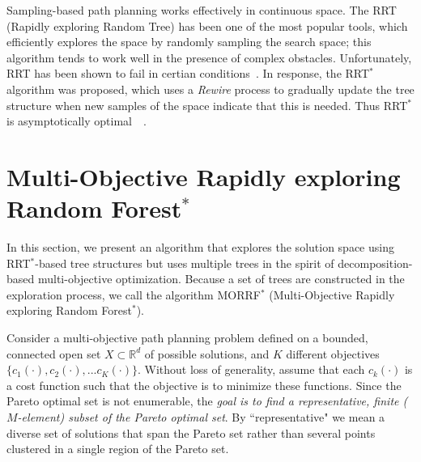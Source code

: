\documentclass{article}
\begin{document}
Sampling-based path planning works effectively in continuous space. 
The RRT (Rapidly exploring Random Tree) has been one of the most popular tools, which  efficiently explores the space by randomly sampling the search space; this algorithm tends to work well in the presence of complex obstacles.
Unfortunately, RRT has been shown to fail in certian conditions~\cite{Karaman.Frazzoli:RSS10}. 
In response, the RRT$^{*}$ algorithm was proposed, which uses a \emph{Rewire} process to gradually update the tree structure when new samples of the space indicate that this is needed. Thus RRT$^{*}$ is asymptotically
optimal~\cite{Karaman.Frazzoli:RSS10}~\cite{Karaman:2011:SAO:2000201.2000209}. 

\section{Multi-Objective Rapidly exploring Random Forest$^{*}$}
\label{sec:morrt}

In this section, we present an algorithm that explores the solution space using RRT$^{*}$-based tree structures but uses multiple trees in the spirit of decomposition-based multi-objective optimization.
Because a set of trees are constructed in the exploration process, we call the algorithm MORRF$^{*}$ (Multi-Objective Rapidly exploring Random Forest$^{*}$).

Consider a multi-objective path planning problem defined on a bounded, connected open set $X\subset\mathbb{R}^d$ of possible solutions, and $K$ different objectives $\{c_{1}(\cdot), c_{2}(\cdot), ... c_{K}(\cdot)\}$. 
Without loss of generality, assume that each $c_{k}(\cdot)$ is a cost function such that the objective is to minimize these functions.  
Since the Pareto optimal set is not enumerable, the {\em goal is to find a representative, finite ($M$-element) subset of the Pareto optimal set}.  
By ``representative" we mean a diverse set of solutions that span the Pareto set rather than
several points clustered in a single region of the Pareto set.  
\end{document}
